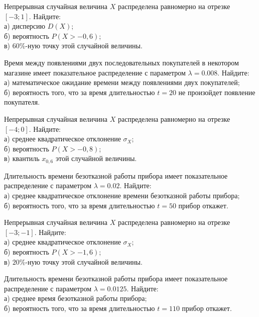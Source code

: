 

\z Непрерывная случайная величина $X$ распределена равномерно на отрезке $[-3; 1]$. Найдите: \\ \quad а) дисперсию $D(X)$; \\ \quad б) вероятность $P(X>-0{,}6)$; \\ \quad в) $60\%$-ную точку этой случайной величины.


\vfill

\z Время между появлениями двух последовательных покупателей в некотором магазине имеет показательное распределение с параметром $\lambda = 0.008$. Найдите: \\ \quad а) математическое ожидание времени между появлениями двух покупателей; \\ \quad б) вероятность того, что за время длительностью $t = 20$ не произойдет появление покупателя.
 

\vfill

\newpage\setcounter{zad}{0}

\z Непрерывная случайная величина $X$ распределена равномерно на отрезке $[-4; 0]$. Найдите: \\ \quad а) среднее квадратическое отклонение $\sigma_X$; \\ \quad б) вероятность $P(X>-0{,}8)$; \\ \quad в) квантиль $x_{0{,}6}$ этой случайной величины.


\vfill

\z Длительность времени безотказной работы прибора имеет показательное распределение с параметром $\lambda = 0.02$. Найдите: \\ \quad а) среднее квадратическое отклонение времени безотказной работы прибора; \\ \quad б) вероятность того, что за время длительностью $t = 50$ прибор  откажет.
 

\vfill

\newpage\setcounter{zad}{0}

\z Непрерывная случайная величина $X$ распределена равномерно на отрезке $[-3; -1]$. Найдите: \\ \quad а) среднее квадратическое отклонение $\sigma_X$; \\ \quad б) вероятность $P(X>-1{,}6)$; \\ \quad в) $20\%$-ную точку этой случайной величины.


\vfill

\z Длительность времени безотказной работы прибора имеет показательное распределение с параметром $\lambda = 0.0125$. Найдите: \\ \quad а) среднее время безотказной работы прибора; \\ \quad б) вероятность того, что за время длительностью $t = 110$ прибор  откажет.
 

